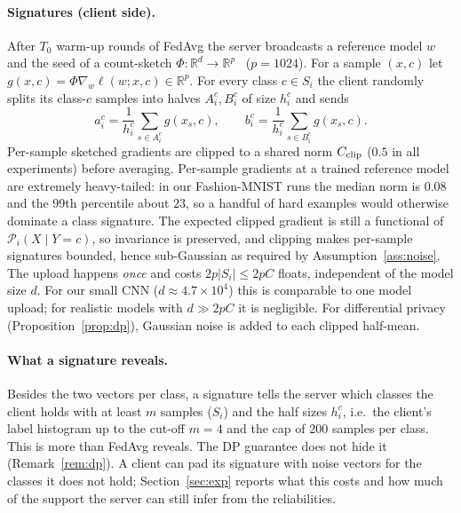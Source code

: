 \documentclass[11pt]{article}
\theoremstyle{definition}
\theoremstyle{remark}
\newcommand{\R}{\mathbb{R}}
\newcommand{\cP}{\mathcal{P}}
\begin{document}
\paragraph{Signatures (client side).}
After $T_0$ warm-up rounds of FedAvg the server broadcasts a reference model $w$ and the seed of a count-sketch $\Phi:\R^d\to\R^p$~\citep{charikar2002countsketch,weinberger2009hashing} ($p=1024$). For a sample $(x,c)$ let $g(x,c)=\Phi\nabla_w\ell(w;x,c)\in\R^p$. For every class $c\in S_i$ the client randomly splits its class-$c$ samples into halves $A_i^c,B_i^c$ of size $h_i^c$ and sends
\[ a_i^c=\frac1{h_i^c}\sum_{s\in A_i^c}g(x_s,c),\qquad b_i^c=\frac1{h_i^c}\sum_{s\in B_i^c}g(x_s,c). \]
Per-sample sketched gradients are clipped to a shared norm $C_{\rm clip}$ ($0.5$ in all experiments) before averaging. Per-sample gradients at a trained reference model are extremely heavy-tailed: in our Fashion-MNIST runs the median norm is $0.08$ and the 99th percentile about $23$, so a handful of hard examples would otherwise dominate a class signature. The expected clipped gradient is still a functional of $\cP_i(X\mid Y=c)$, so invariance is preserved, and clipping makes per-sample signatures bounded, hence sub-Gaussian as required by Assumption~\ref{ass:noise}. The upload happens \emph{once} and costs $2p|S_i|\le 2pC$ floats, independent of the model size $d$. For our small CNN ($d\approx4.7\times10^4$) this is comparable to one model upload; for realistic models with $d\gg 2pC$ it is negligible. For differential privacy (Proposition~\ref{prop:dp}), Gaussian noise is added to each clipped half-mean.

\paragraph{What a signature reveals.} Besides the two vectors per class, a signature tells the server which classes the client holds with at least $m$ samples ($S_i$) and the half sizes $h_i^c$, i.e.\ the client's label histogram up to the cut-off $m=4$ and the cap of 200 samples per class. This is more than FedAvg reveals. The DP guarantee does not hide it (Remark~\ref{rem:dp}). A client can pad its signature with noise vectors for the classes it does not hold; Section~\ref{sec:exp} reports what this costs and how much of the support the server can still infer from the reliabilities.
\end{document}
